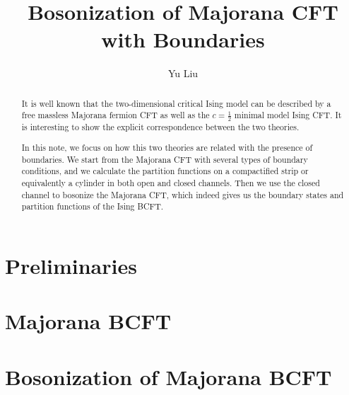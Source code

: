 \documentclass[12pt]{article}
\begin{document}
\title{\boldmath Bosonization of Majorana CFT with Boundaries}
\author{Yu Liu}

\maketitle

\begin{abstract}
  It is well known that the two-dimensional critical Ising model can be described by a free massless Majorana fermion CFT as well as the $c=\frac{1}{2}$ minimal model Ising CFT. It is interesting to show the explicit correspondence between the two theories.

  In this note, we focus on how this two theories are related with the presence of boundaries. We start from the Majorana CFT with several types of boundary conditions, and we calculate the partition functions on a compactified strip or equivalently a cylinder in both open and closed channels. Then we use the closed channel to bosonize the Majorana CFT, which indeed gives us the boundary states and partition functions of the Ising BCFT.
\end{abstract}

\tableofcontents

\section{Preliminaries}\label{sec:Preliminaries} %

% 


\section{Majorana BCFT}\label{sec:Free Majorana Fermion BCFT} %


\section{Bosonization of Majorana BCFT}\label{sec:Bosonization of Majorana BCFT} %


% 


\end{document}
